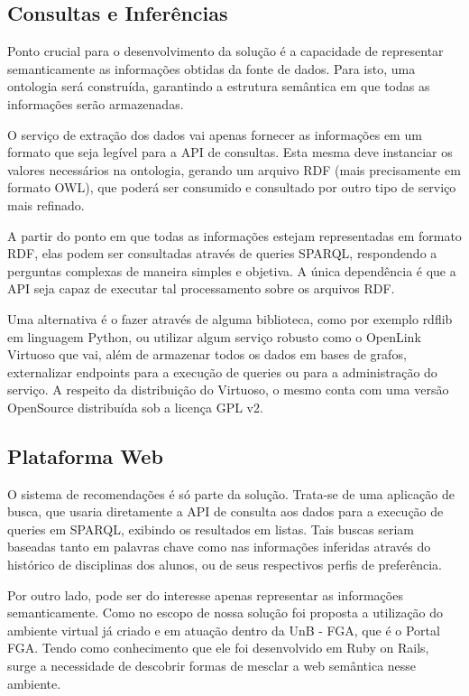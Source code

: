 \subsection{Consultas e Inferências} %
\label{sub:consultas_e_interfer_ncias}

	Ponto crucial para o desenvolvimento da solução é a capacidade de representar semanticamente as informações obtidas da fonte de dados. Para isto, uma ontologia será construída, garantindo a estrutura semântica em que todas as informações serão armazenadas.

	O serviço de extração dos dados vai apenas fornecer as informações em um formato que seja legível para a API de consultas. Esta mesma deve instanciar os valores necessários na ontologia, gerando um arquivo RDF (mais precisamente em formato OWL), que poderá ser consumido e consultado por outro tipo de serviço mais refinado.

	A partir do ponto em que todas as informações estejam representadas em formato RDF, elas podem ser consultadas através de queries SPARQL, respondendo a perguntas complexas de maneira simples e objetiva. A única dependência é que a API seja capaz de executar tal processamento sobre os arquivos RDF. 

	Uma alternativa é o fazer através de alguma biblioteca, como por exemplo rdflib em linguagem Python, ou utilizar algum serviço robusto como o OpenLink Virtuoso que vai, além de armazenar todos os dados em bases de grafos, externalizar endpoints para a execução de queries ou para a administração do serviço. A respeito da distribuição do Virtuoso, o mesmo conta com uma versão OpenSource distribuída sob a licença GPL v2. 


\subsection{Plataforma Web} %
\label{sub:plataforma_web}

	O sistema de recomendações é só parte da solução. Trata-se de uma aplicação de busca, que usaria diretamente a API de consulta aos dados para a execução de queries em SPARQL, exibindo os resultados em listas. Tais buscas seriam baseadas tanto em palavras chave como nas informações inferidas através do histórico de disciplinas dos alunos, ou de seus respectivos perfis de preferência.
	
	Por outro lado, pode ser do interesse apenas representar as informações semanticamente. Como no escopo de nossa solução foi proposta a utilização do ambiente virtual já criado e em atuação dentro da UnB - FGA, que é o Portal FGA. Tendo como conhecimento que ele foi desenvolvido em Ruby on Rails, surge a necessidade de descobrir formas de mesclar a web semântica nesse ambiente.

